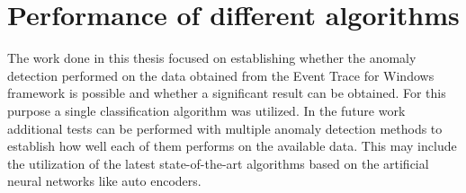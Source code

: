 \documentclass[a4paper,twoside,12pt]{book}
\newcounter{PagesWithoutNumbers}
\begin{document}
\section{Performance of different algorithms}

The work done in this thesis focused on establishing whether the anomaly detection performed on the
data obtained from the Event Trace for Windows framework is possible and whether a significant result
can be obtained. For this purpose a single classification algorithm was utilized. In the future work 
additional tests can be performed with multiple anomaly detection methods to establish how well each 
of them performs on the available data. This may include the utilization of the latest state-of-the-art 
algorithms based on the artificial neural networks like auto encoders.


\backmatter
{}
\setcounter{page}{\value{PagesWithoutNumbers}}

\pagestyle{onlyPageNumbers}




\end{document}
